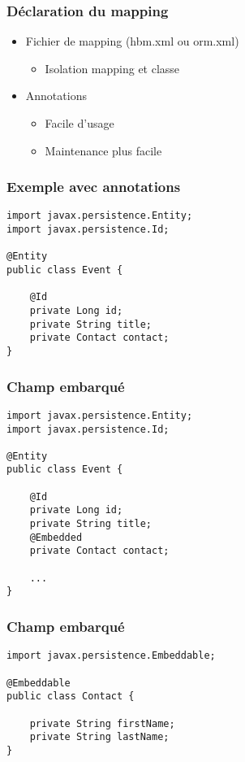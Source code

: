 \documentclass[t,12pt]{beamer}
\begin{document}
\begin{frame}
	\frametitle{D\'eclaration du mapping}

	\begin{itemize}
		\item Fichier de mapping (hbm.xml ou orm.xml)
			\begin{itemize}
				\item Isolation mapping et classe
			\end{itemize}
		\item Annotations
			\begin{itemize}
				\item Facile d'usage
				\item Maintenance plus facile
			\end{itemize}
	\end{itemize}
\end{frame}

\begin{frame}[fragile]
	\frametitle{Exemple avec annotations}

	\begin{lstlisting}[frame=single]
import javax.persistence.Entity;
import javax.persistence.Id;

@Entity
public class Event {

    @Id
    private Long id;
    private String title;
    private Contact contact;
}
	\end{lstlisting}
\end{frame}

\begin{frame}[fragile]
	\frametitle{Champ embarqu\'e}

	\begin{lstlisting}[frame=single]
import javax.persistence.Entity;
import javax.persistence.Id;

@Entity
public class Event {

    @Id
    private Long id;
    private String title;
    @Embedded
    private Contact contact;

    ...
}
	\end{lstlisting}
\end{frame}

\begin{frame}[fragile]
	\frametitle{Champ embarqu\'e}

	\begin{lstlisting}[frame=single]
import javax.persistence.Embeddable;

@Embeddable
public class Contact {

    private String firstName;
    private String lastName;
}
	\end{lstlisting}
\end{frame}
\end{document}
